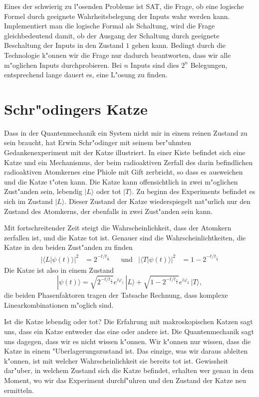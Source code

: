 Eines der schwierig zu l"osenden Probleme ist SAT, die Frage, ob eine
logische Formel durch geeignete Wahrheitsbelegung der Inputs wahr
werden kann. Implementiert man die logische Formal als Schaltung,
wird die Frage gleichbedeutend damit, ob der Ausgang der Schaltung
durch geeignete Beschaltung der Inputs in den Zustand $1$  gehen kann.
Bedingt durch die Technologie k"onnen wir die Frage nur dadurch beantworten,
dass wir alle m"oglichen Inputs durchprobieren. Bei $n$ Inputs sind
dies $2^n$ Belegungen, entsprechend lange dauert es, eine L"osung
zu finden.

\section{Schr"odingers Katze\label{section:cat}}
Dass in der Quantenmechanik ein System nicht mir in einem reinen Zustand
zu sein braucht, hat Erwin Schr"odinger mit seinem ber"uhmten 
Gedankenexperiment mit der Katze illustriert.
In einer Kiste befindet sich eine Katze und ein Mechanismus,
der beim radioaktiven Zerfall des darin befindlichen radioaktiven
Atomkernes eine Phiole mit Gift zerbricht, so dass es ausweichen und
die Katze t"oten kann.
Die Katze kann offensichtlich in zwei m"oglichen Zust"anden sein,
lebendig $|L\rangle$ oder tot $|T\rangle$. 
Zu beginn des Experiments befindet es sich im Zustand $|L\rangle$.
Dieser Zustand der Katze wiederspiegelt nat"urlich nur den Zustand
des Atomkerns, der ebenfalls in zwei Zust"anden sein kann.

Mit fortschreitender Zeit steigt die Wahrscheinlichkeit, dass der
Atomkern zerfallen ist, und die Katze tot ist.
Genauer sind die Wahrscheinlichtkeiten, die Katze in den beiden
Zust"anden zu finden
\begin{align*}
|\langle L|\psi(t)\rangle|^2
&=
2^{-t/t_{\frac12}}
&&\text{und}
&
|\langle T|\psi(t)\rangle|^2
&=
1-2^{-t/t_{\frac12}}
\end{align*}
Die Katze ist also in einem Zustand
\[
|\psi(t)\rangle = 
\sqrt{2^{-t/t_{\frac12}}}e^{i\varphi_1}\,|L\rangle
+
\sqrt{1-2^{-t/t_{\frac12}}}e^{i\varphi_2}\,|T\rangle,
\]
die beiden Phasenfaktoren tragen der Tatsache Rechnung, dass komplexe
Linearkombinationen m"oglich sind.

Ist die Katze lebendig oder tot? Die Erfahrung mit makroskopischen
Katzen sagt uns, dass ein Katze entweder das eine oder andere ist.
Die Quantenmechanik sagt uns dagegen, dass wir es nicht wissen k"onnen.
Wir k"onnen nur wissen, dass die Katze in einem "Uberlagerungszustand
ist.
Das einzige, was wir daraus ableiten k"onnen, ist mit welcher
Wahrscheinlichkeit sie bereits tot ist.
Gewissheit dar"uber, in welchem Zustand sich die Katze befindet,
erhalten wer genau in dem Moment, wo wir das Experiment durchf"uhren
und den Zustand der Katze neu ermitteln.

